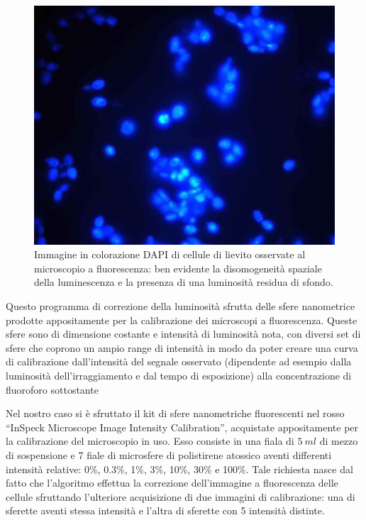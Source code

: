 \begin{figure}
 \centering
 \includegraphics[scale=.55]{img/CAP3bordi.jpg}
 \caption{\small{Immagine in colorazione DAPI di cellule di lievito osservate al microscopio a fluorescenza: ben evidente la disomogeneità spaziale della luminescenza e la presenza di una luminosità residua di sfondo.}}
 \label{fig:bordi}
\end{figure}

Questo programma di correzione della luminosità sfrutta delle sfere nanometrice prodotte appositamente per la calibrazione dei microscopi a fluorescenza.
Queste sfere sono di dimensione costante e intensità di luminosità nota, con diversi set di sfere che coprono un ampio range di intensità in modo da poter creare una curva di calibrazione dall'intensità del segnale osservato (dipendente ad esempio dalla luminosità dell'irraggiamento e dal tempo di esposizione) alla concentrazione di fluoroforo sottostante
 
Nel nostro caso si è sfruttato il kit di sfere nanometriche fluorescenti nel rosso ``InSpeck Microscope Image Intensity Calibration'', acquistate appositamente per la calibrazione del microscopio in uso.
Esso consiste in una fiala di $5\ ml$ di mezzo di sospensione e 7 fiale di microsfere di polistirene atossico aventi differenti intensità relative: 0\%, 0.3\%, 1\%, 3\%, 10\%, 30\% e 100\%.
Tale richiesta nasce dal fatto che l'algoritmo effettua la correzione dell'immagine a fluorescenza delle cellule sfruttando l'ulteriore acquisizione di due immagini di calibrazione: una di sferette aventi stessa intensità e l'altra di sferette con 5 intensità distinte.

